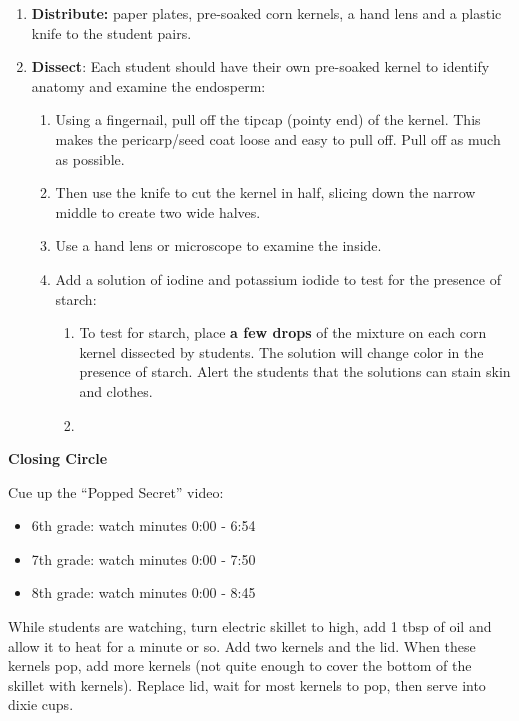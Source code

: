 \documentclass[12pt,]{article}
\providecommand{\tightlist}{%
  \setlength{\itemsep}{0pt}\setlength{\parskip}{0pt}}
\begin{document}
\begin{enumerate}
\def\labelenumi{\arabic{enumi}.}
\tightlist
\item
  \textbf{Distribute:} paper plates, pre-soaked corn kernels, a hand lens and a plastic knife to the student pairs.
\item
  \textbf{Dissect}: Each student should have their own pre-soaked kernel to identify anatomy and examine the endosperm:

  \begin{enumerate}
  \def\labelenumii{\arabic{enumii}.}
  \tightlist
  \item
    Using a fingernail, pull off the tipcap (pointy end) of the kernel. This makes the pericarp/seed coat loose and easy to pull off. Pull off as much as possible.
  \item
    Then use the knife to cut the kernel in half, slicing down the narrow middle to create two wide halves.
  \item
    Use a hand lens or microscope to examine the inside.
  \item
    Add a solution of iodine and potassium iodide to test for the presence of starch:

    \begin{enumerate}
    \def\labelenumiii{\arabic{enumiii}.}
    \item
      To test for starch, place \textbf{a few drops} of the mixture on each corn kernel dissected by students. The solution will change color in the presence of starch. Alert the students that the solutions can stain skin and clothes.
    \item
    \end{enumerate}
  \end{enumerate}
\end{enumerate}

\textbf{Closing Circle}

Cue up the ``Popped Secret'' video:

\begin{itemize}
\tightlist
\item
  6th grade: watch minutes 0:00 - 6:54
\item
  7th grade: watch minutes 0:00 - 7:50
\item
  8th grade: watch minutes 0:00 - 8:45
\end{itemize}

While students are watching, turn electric skillet to high, add 1 tbsp of oil and allow it to heat for a minute or so. Add two kernels and the lid. When these kernels pop, add more kernels (not quite enough to cover the bottom of the skillet with kernels). Replace lid, wait for most kernels to pop, then serve into dixie cups.
\end{document}
